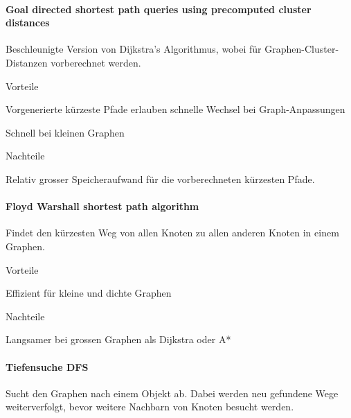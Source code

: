 \paragraph{Goal directed shortest path queries using precomputed cluster distances}
Beschleunigte Version von Dijkstra's Algorithmus, wobei für Graphen-Cluster-Distanzen vorberechnet werden.

\begin{minipage}[t]{0.48\textwidth}
\begin{items}
  \item [Vorteile]
  \item Vorgenerierte kürzeste Pfade erlauben schnelle Wechsel bei Graph-Anpassungen
  \item Schnell bei kleinen Graphen
\end{items}
\end{minipage}
\hfill
\begin{minipage}[t]{0.48\textwidth}
\begin{items}
  \item [Nachteile]
  \item Relativ grosser Speicheraufwand für die vorberechneten kürzesten Pfade.
\end{items}
\end{minipage}

\paragraph{Floyd Warshall shortest path algorithm}
Findet den kürzesten Weg von allen Knoten zu allen anderen Knoten in einem Graphen.

\begin{minipage}[t]{0.48\textwidth}
\begin{items}
  \item [Vorteile]
  \item Effizient für kleine und dichte Graphen
\end{items}
\end{minipage}
\hfill
\begin{minipage}[t]{0.48\textwidth}
\begin{items}
  \item [Nachteile]
  \item Langsamer bei grossen Graphen als Dijkstra oder A* 
\end{items}
\end{minipage}

\paragraph{Tiefensuche DFS}
Sucht den Graphen nach einem Objekt ab. Dabei werden neu gefundene Wege weiterverfolgt, bevor weitere Nachbarn von Knoten besucht werden.

